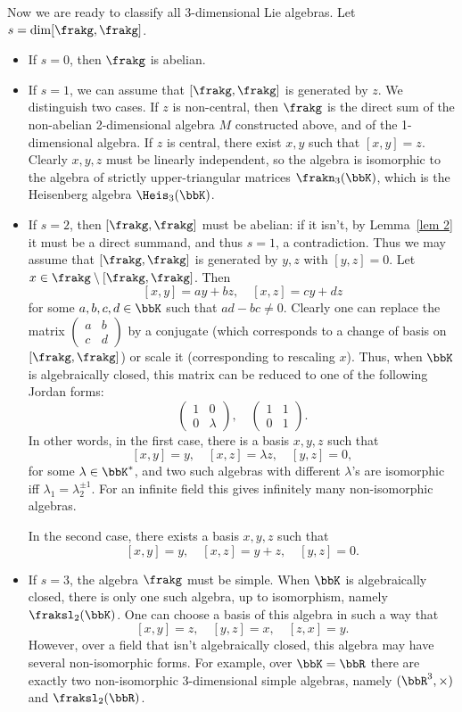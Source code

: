 Now we are ready to classify all 3-dimensional Lie algebras. Let $s=\dim[\frakg,\frakg]$.
\begin{itemize}
    \item If $s=0$, then $\frakg$ is abelian.
    \item If $s=1$, we can assume that $[\frakg,\frakg]$ is generated by $z$. We distinguish two cases. If $z$ is non-central, then $\frakg$ is the direct sum of the non-abelian 2-dimensional algebra $M$ constructed above, and of the 1-dimensional algebra. If $z$ is central, there exist $x,y$ such that $[x,y]=z$. Clearly $x,y,z$ must be linearly independent, so the algebra is isomorphic to the algebra of strictly upper-triangular matrices $\frakn_3(\bbK)$, which is the Heisenberg algebra $\Heis_3(\bbK)$.
    \item If $s=2$, then $[\frakg,\frakg]$ must be abelian: if it isn't, by Lemma~\ref{lem 2} it must be a direct summand, and thus $s=1$, a contradiction. Thus we may assume that $[\frakg,\frakg]$ is generated by $y,z$ with $[y,z]=0$. Let $x\in \frakg\setminus[\frakg,\frakg]$. Then
    \[[x,y]=ay+bz,\quad [x,z]=cy+dz\]
    for some $a,b,c,d\in\bbK$ such that $ad-bc\neq 0$. Clearly one can replace the matrix $\begin{pmatrix}
        a&b\\c&d
    \end{pmatrix}$
    by a conjugate (which corresponds to a change of basis on $[\frakg,\frakg]$) or scale it (corresponding to rescaling $x$). Thus, when $\bbK$ is algebraically closed, this matrix can be reduced to one of the following Jordan forms:
    \[\begin{pmatrix}
        1&0\\
        0&\lambda
    \end{pmatrix},\quad 
    \begin{pmatrix}
        1&1\\
        0&1
    \end{pmatrix}.\]
    In other words, in the first case, there is a basis $x,y,z$ such that
    \[[x,y]=y,\quad [x,z]=\lambda z,\quad [y,z]=0,\]
    for some $\lambda\in\bbK^\ast$, and two such algebras with different $\lambda$'s are isomorphic iff $\lambda_1=\lambda_2^{\pm 1}$. For an infinite field this gives infinitely many non-isomorphic algebras. 

    In the second case, there exists a basis $x,y,z$ such that
    \[[x,y]=y,\quad [x,z]=y+z,\quad [y,z]=0.\]

    \item If $s=3$, the algebra $\frakg$ must be simple. When $\bbK$ is algebraically closed, there is only one such algebra, up to isomorphism, namely $\fraksl_2(\bbK)$. One can choose a basis of this algebra in such a way that 
    \[[x,y]=z,\quad [y,z]=x,\quad [z,x]=y.\]
    However, over a field that isn't algebraically closed, this algebra may have several non-isomorphic forms. For example, over $\bbK=\bbR$ there are exactly two non-isomorphic 3-dimensional simple algebras, namely $(\bbR^3,\times)$ and $\fraksl_2(\bbR)$.
\end{itemize}


